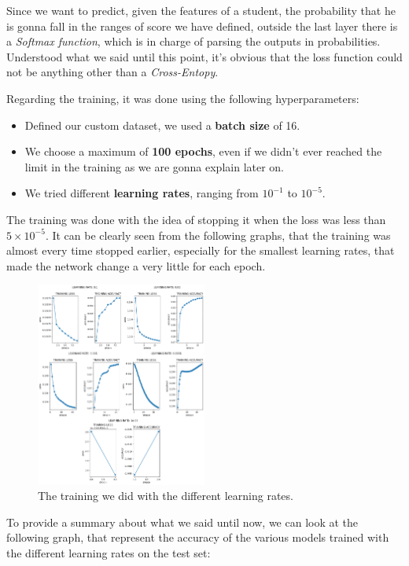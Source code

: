 \documentclass{article}
\begin{document}
Since we want to predict, given the features of a student, the probability that he is gonna fall in the ranges of score we have defined, outside the last layer there is a \emph{Softmax function}, which is in charge
of parsing the outputs in probabilities. 
Understood what we said until this point, it's obvious that the loss function could not be anything other than a \emph{Cross-Entopy}.

Regarding the training, it was done using the following hyperparameters:

\begin{itemize}
    \item Defined our custom dataset, we used a \textbf{batch size} of 16.
    \item We choose a maximum of \textbf{100 epochs}, even if we didn't ever reached the limit in the training as we are gonna explain later on.
    \item We tried different \textbf{learning rates}, ranging from $10^{-1}$ to $10^{-5}$.
\end{itemize}

The training was done with the idea of stopping it when the loss was less than $5 \times 10^{-5}$. It can be clearly seen from the following graphs, that the training was almost every time stopped earlier,
especially for the smallest learning rates, that made the network change a very little for each epoch.

\begin{figure}[h!]
    \centering
    \includegraphics[width=0.5\textwidth]{lr_training.png}
    \caption{\label{fig:lr}The training we did with the different learning rates.}
\end{figure}

To provide a summary about what we said until now, we can look at the following graph, that represent the accuracy of the various models trained 
with the different learning rates on the test set:
\end{document}
